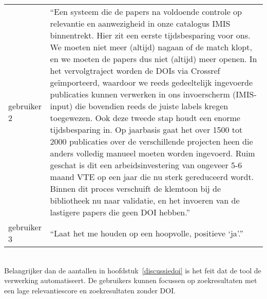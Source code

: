 \begin{table}[h!]
\begin{tabularx}{\textwidth}{|p{2cm}|X|}
        gebruiker 2&\enquote{Een systeem die de papers na voldoende controle op relevantie en aanwezigheid in onze catalogus IMIS binnentrekt. Hier zit een eerste tijdsbesparing voor ons. We moeten niet meer (altijd) nagaan of de match klopt, en we moeten de papers dus niet (altijd) meer openen. In het vervolgtraject worden de DOIs via Crossref geïmporteerd, waardoor we reeds gedeeltelijk ingevoerde publicaties kunnen verwerken in ons invoerscherm (IMIS-input) die bovendien reeds de juiste labels kregen toegewezen. Ook deze tweede stap houdt een enorme tijdsbesparing in. Op jaarbasis gaat het over 1500 tot 2000 publicaties over de verschillende projecten heen die anders volledig manueel moeten worden ingevoerd. Ruim geschat is dit een arbeidsinvestering van ongeveer 5-6 maand VTE op een jaar die nu sterk gereduceerd wordt. Binnen dit proces verschuift de klemtoon bij de bibliotheek nu naar validatie, en het invoeren van de lastigere papers die geen DOI hebben.}\\
        gebruiker 3&\enquote{Laat het me houden op een hoopvolle, positieve ‘ja’.}\\
        \hline
    \end{tabularx}
    \label{table:gebruikersfeedback}
\end{table}
\\
Belangrijker dan de aantallen in hoofdstuk~\ref{discussiedoi} is het feit dat de tool de verwerking automatiseert. De gebruikers kunnen focussen op zoekresultaten met een lage relevantiescore en zoekresultaten zonder DOI.
